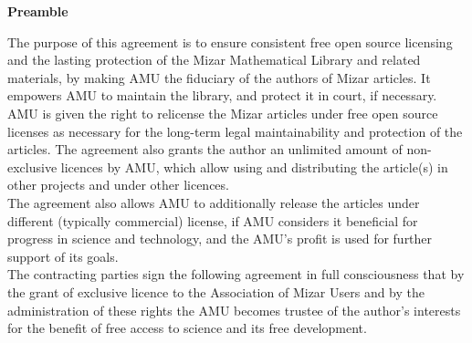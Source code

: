
\begin{center}
{\Large\bf Preamble}
\end{center}

The purpose of this agreement is to ensure consistent free open source
licensing and the lasting protection of the Mizar Mathematical Library
and related materials, by making AMU the fiduciary of the authors of
Mizar articles.  It empowers AMU to maintain the library, and protect
it in court, if necessary.\\

AMU is given the right to relicense the Mizar articles under free open
source licenses as necessary for the long-term legal maintainability
and protection of the articles. The agreement also grants the author
an unlimited amount of non-exclusive licences by AMU, which allow
using and distributing the article(s) in
other projects and under other licences. \\

The agreement also allows AMU to
additionally release the articles under different (typically
commercial) license, if AMU considers it beneficial for progress in
science and technology, and the AMU's profit is used for further support
of its goals.\\

The contracting parties sign the following agreement in full
consciousness that by the grant of exclusive licence to the
Association of Mizar Users and by the administration of these rights
the AMU becomes trustee of the author's interests for
the benefit of free access to science and its free development.\\



 


